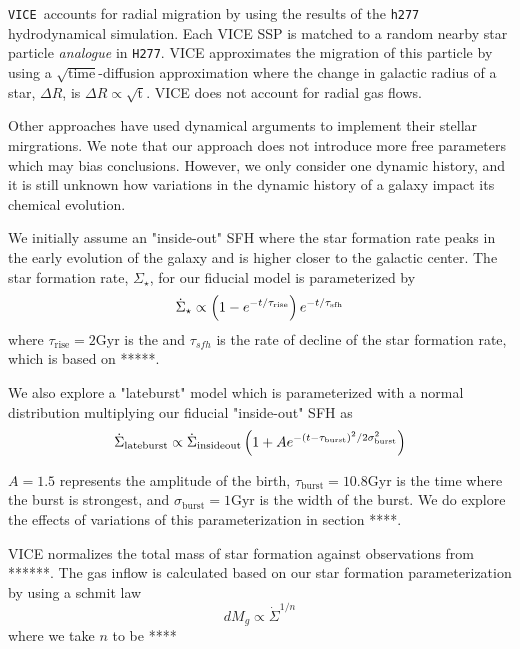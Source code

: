 \documentclass[fleqn,usenatbib]{mnras}
\newcommand{\VICE}{\texttt{VICE}}
\begin{document}
\VICE\ accounts for radial migration by using the results of the \texttt{h277} hydrodynamical simulation. Each VICE SSP is matched to a random nearby star particle \textit{analogue} in \texttt{H277}. VICE approximates the migration of this particle by using a $\sqrt{\text{time}}$-diffusion approximation where the change in galactic radius of a star, $\Delta R$, is $\Delta R \propto \sqrt{\text{t}}$. 
VICE does not account for radial gas flows. 

Other approaches have used dynamical arguments to implement their stellar mirgrations. We note that our approach does not introduce more free parameters which may bias conclusions. However, we only consider one dynamic history, and it is still unknown how variations in the dynamic history of a galaxy impact its chemical evolution.


We initially assume an "inside-out" SFH where the star formation rate peaks in the early evolution of the galaxy and is higher closer to the galactic center. The star formation rate, $\Sigma_\star$, for our fiducial model is parameterized by
\begin{equation}
    \dot{\Sigma}_\star \propto \left(1-e^{-t/\tau_{\rm rise}}\right) e^{-t/\tau_{\rm sfh}}
\end{equation}
where $\tau_\text{rise}=2$Gyr is the
and $\tau_{sfh}$ is the rate of decline of the star formation rate, which is based on *****.

We also explore a "lateburst" model which is parameterized with a normal distribution multiplying our fiducial "inside-out" SFH as
\begin{equation}\label{eq:lateburst}
    \dot{\Sigma}_{\rm lateburst} \propto \dot{\Sigma}_{\rm insideout} \left(1 + A e^{-(t-\tau_{\rm burst})^2/2\sigma^2_{\rm burst}} \right)
\end{equation}

$A=1.5$ represents the amplitude of the birth, $\tau_\text{burst}=10.8$Gyr is the time where the burst is strongest, and $\sigma_\text{burst}=1$Gyr is the width of the burst. We do explore the effects of variations of this parameterization in section ****.


VICE normalizes the total mass of star formation against observations from ******.
The gas inflow is calculated based on our star formation parameterization by using a schmit law 
\begin{equation}
    dM_g \propto \dot{\Sigma}^{1/n}
\end{equation}
where we take $n$ to be ****
\end{document}
